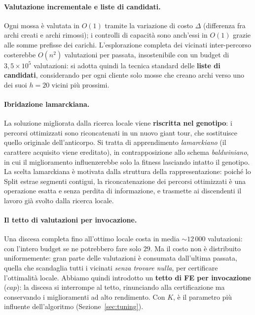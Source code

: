 \documentclass[10pt,a4paper]{article}
\begin{document}
\paragraph{Valutazione incrementale e liste di candidati.} Ogni mossa è valutata
in $O(1)$ tramite la variazione di costo $\Delta$ (differenza fra archi creati e
archi rimossi); i controlli di capacità sono anch'essi in $O(1)$ grazie alle
somme prefisse dei carichi. L'esplorazione completa dei vicinati
inter-percorso costerebbe $O(n^2)$ valutazioni per passata, insostenibile con un
budget di $3{,}5\times10^5$ valutazioni: si adotta quindi la tecnica standard
delle \textbf{liste di candidati}, considerando per ogni cliente solo mosse che
creano archi verso uno dei suoi $h=20$ vicini più prossimi.

\paragraph{Ibridazione lamarckiana.} La soluzione migliorata dalla ricerca locale
viene \textbf{riscritta nel genotipo}: i percorsi ottimizzati sono riconcatenati
in un nuovo giant tour, che sostituisce quello originale dell'anticorpo. Si tratta
di apprendimento \emph{lamarckiano} (il carattere acquisito viene ereditato), in
contrapposizione allo schema \emph{baldwiniano}, in cui il miglioramento
influenzerebbe solo la fitness lasciando intatto il genotipo. La scelta
lamarckiana è motivata dalla struttura della rappresentazione: poiché lo Split
estrae segmenti contigui, la riconcatenazione dei percorsi ottimizzati è una
operazione esatta e senza perdita di informazione, e trasmette ai discendenti il
lavoro già svolto dalla ricerca locale.

\paragraph{Il tetto di valutazioni per invocazione.} Una discesa completa fino
all'ottimo locale costa in media $\sim\!12\,000$ valutazioni: con l'intero budget se
ne potrebbero fare solo $29$. Ma il costo non è distribuito uniformemente: gran
parte delle valutazioni è consumata dall'ultima passata, quella che scandaglia tutti
i vicinati \emph{senza trovare nulla}, per certificare l'ottimalità locale. Abbiamo
quindi introdotto un \textbf{tetto di FE per invocazione} ($\mathit{cap}$): la
discesa si interrompe al tetto, rinunciando alla certificazione ma conservando i
miglioramenti ad alto rendimento. Con $K$, è il parametro più influente
dell'algoritmo (Sezione~\ref{sec:tuning}).
\end{document}
